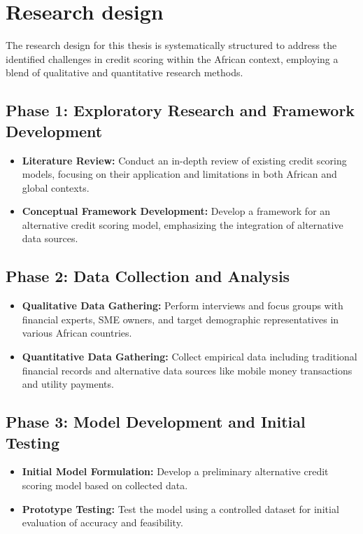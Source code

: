 \documentclass[a4paper,11pt,fleqn]{report}
\begin{document}
\section{Research design}

The research design for this thesis is systematically structured to address the identified challenges in credit scoring within the African context, employing a blend of qualitative and quantitative research methods.

\subsection{Phase 1: Exploratory Research and Framework Development}
\begin{itemize}
    \item \textbf{Literature Review:} Conduct an in-depth review of existing credit scoring models, focusing on their application and limitations in both African and global contexts.
    \item \textbf{Conceptual Framework Development:} Develop a framework for an alternative credit scoring model, emphasizing the integration of alternative data sources.
\end{itemize}

\subsection{Phase 2: Data Collection and Analysis}
\begin{itemize}
    \item \textbf{Qualitative Data Gathering:} Perform interviews and focus groups with financial experts, SME owners, and target demographic representatives in various African countries.
    \item \textbf{Quantitative Data Gathering:} Collect empirical data including traditional financial records and alternative data sources like mobile money transactions and utility payments.
\end{itemize}

\subsection{Phase 3: Model Development and Initial Testing}
\begin{itemize}
    \item \textbf{Initial Model Formulation:} Develop a preliminary alternative credit scoring model based on collected data.
    \item \textbf{Prototype Testing:} Test the model using a controlled dataset for initial evaluation of accuracy and feasibility.
\end{itemize}
\end{document}

